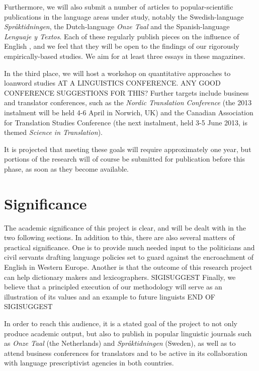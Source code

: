 \documentclass[a4paper]{article}
\begin{document}
Furthermore, we will also submit a number of articles to popular-scientific publications in the language areas under study, notably the Swedish-language \emph{Spr\aa ktidningen}, the Dutch-language \emph{Onze Taal} and the Spanish-language \emph{Lenguaje y Textos}. Each of these regularly publish pieces on the influence of English , and we feel that they will be open to the findings of our rigorously empirically-based studies. We aim for at least three essays in these magazines.

In the third place, we will host a workshop on quantitative approaches to loanword studies AT A LINGUISTICS CONFERENCE. ANY GOOD CONFERENCE SUGGESTIONS FOR THIS? Further targets include business and translator conferences, such as the \emph{Nordic Translation Conference} (the 2013 instalment will be held 4-6 April in Norwich, UK) and the Canadian Association for Translation Studies Conference (the next instalment, held 3-5 June 2013, is themed \emph{Science in Translation}). 

It is projected that meeting these goals will require approximately one year, but portions of the research will of course be submitted for publication before this phase, as soon as they become available.



\section{Significance}
The academic significance of this project is clear, and will be dealt with in the two following sections. In addition to this, there are also several matters of  practical significance. One is to provide much needed input to the politicians and civil servants drafting language policies set to guard against the encroachment of English in Western Europe. Another is that the outcome of this research project can help dictionary makers and lexicographers. SIGISUGGEST Finally, we believe that a principled execution of our methodology will serve as an illustration of its values and an example to future linguists END OF SIGISUGGEST

In order to reach this audience, it is a stated goal of the project to not only produce academic output, but also to publish in popular linguistic journals such as \emph{Onze Taal} (the Netherlands) and \emph{Spr\aa ktidningen} (Sweden), as well as to attend business conferences for translators and to be active in its collaboration with language prescriptivist agencies in both countries. 
\end{document}
